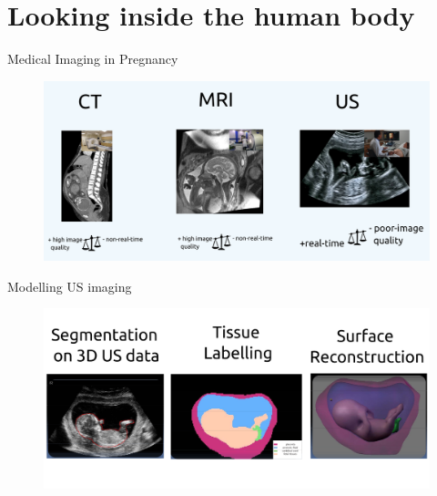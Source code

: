 \section{Looking inside the human body}


{
\begin{frame}{Medical Imaging in Pregnancy}
      \begin{figure}
        \centering
        \includegraphics[width=1.0\textwidth]{./figures/medical-imaging/versions/drawing-v01.png}
      \end{figure}
\end{frame}
}


{


\begin{frame}{Modelling US imaging}
      \begin{figure}
        \centering
        \includegraphics[width=1.0\textwidth]{./figures/modelling-us-imaging/versions/drawing-v01.png}
      \end{figure}
\end{frame}
}



